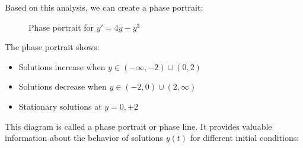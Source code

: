 \documentclass{article}
\begin{document}
Based on this analysis, we can create a phase portrait:

\begin{figure}[h]
    \centering
    \caption{Phase portrait for $y' = 4y - y^3$}
    \label{fig:phase_portrait_4y_minus_y3}
\end{figure}

The phase portrait shows:
\begin{itemize}
    \item Solutions increase when $y \in (-\infty, -2) \cup (0, 2)$
    \item Solutions decrease when $y \in (-2, 0) \cup (2, \infty)$
    \item Stationary solutions at $y = 0, \pm 2$
\end{itemize}




This diagram is called a phase portrait or phase line. It provides valuable information about the behavior of solutions $y(t)$ for different initial conditions:
\end{document}
